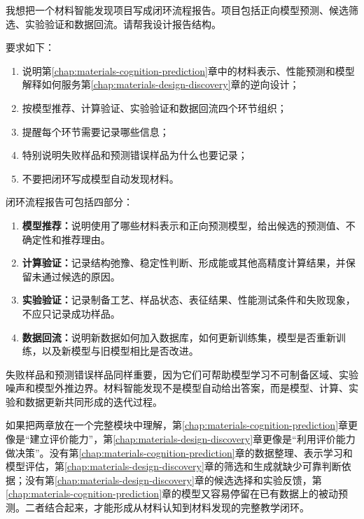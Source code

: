 \begin{samepage}
\begin{userbox}
我想把一个材料智能发现项目写成闭环流程报告。项目包括正向模型预测、候选筛选、实验验证和数据回流。请帮我设计报告结构。

要求如下：
\begin{enumerate}
\item 说明第\ref{chap:materials-cognition-prediction}章中的材料表示、性能预测和模型解释如何服务第\ref{chap:materials-design-discovery}章的逆向设计；
\item 按模型推荐、计算验证、实验验证和数据回流四个环节组织；
\item 提醒每个环节需要记录哪些信息；
\item 特别说明失败样品和预测错误样品为什么也要记录；
\item 不要把闭环写成模型自动发现材料。
\end{enumerate}
\end{userbox}

\begin{aibox}
闭环流程报告可包括四部分：

\begin{enumerate}
\item \textbf{模型推荐：}说明使用了哪些材料表示和正向预测模型，给出候选的预测值、不确定性和推荐理由。
\item \textbf{计算验证：}记录结构弛豫、稳定性判断、形成能或其他高精度计算结果，并保留未通过候选的原因。
\item \textbf{实验验证：}记录制备工艺、样品状态、表征结果、性能测试条件和失败现象，不应只记录成功样品。
\item \textbf{数据回流：}说明新数据如何加入数据库，如何更新训练集，模型是否重新训练，以及新模型与旧模型相比是否改进。
\end{enumerate}

失败样品和预测错误样品同样重要，因为它们可帮助模型学习不可制备区域、实验噪声和模型外推边界。材料智能发现不是模型自动给出答案，而是模型、计算、实验和数据更新共同形成的迭代过程。
\end{aibox}
\end{samepage}

如果把两章放在一个完整模块中理解，第\ref{chap:materials-cognition-prediction}章更像是“建立评价能力”，第\ref{chap:materials-design-discovery}章更像是“利用评价能力做决策”。没有第\ref{chap:materials-cognition-prediction}章的数据整理、表示学习和模型评估，第\ref{chap:materials-design-discovery}章的筛选和生成就缺少可靠判断依据；没有第\ref{chap:materials-design-discovery}章的候选选择和实验反馈，第\ref{chap:materials-cognition-prediction}章的模型又容易停留在已有数据上的被动预测。二者结合起来，才能形成从材料认知到材料发现的完整教学闭环。

